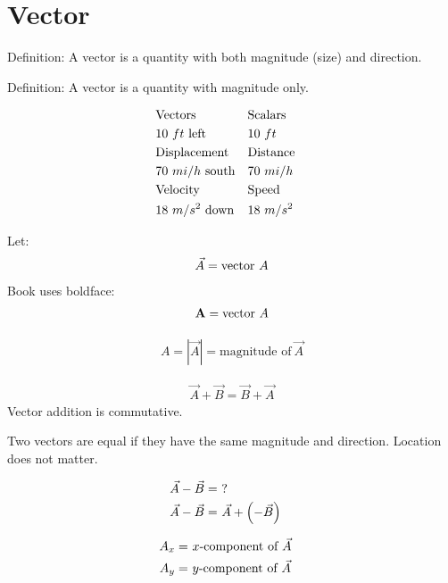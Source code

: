 \section{Vector}
	Definition: A vector is a quantity with both magnitude (size) and direction.

	Definition: A vector is a quantity with magnitude only.

	\begin{align}
		&\text{Vectors}& &\text{Scalars}& \notag \\
		&10 \ ft \ \text{left}& &10 \ ft& \notag \\
		&\text{Displacement}& &\text{Distance}& \notag \\
		&70 \ mi/h \ \text{south}& &70 \ mi/h& \notag \\
		&\text{Velocity}& &\text{Speed}& \notag \\
		&18 \ m/s^{2} \ \text{down}& &18 \ m/s^{2}& \notag \\
	\end{align}

	Let:
	\begin{align}
		\vec{A} = \text{vector} \ A \notag
	\end{align}
	Book uses boldface:
	\begin{align}
		\text{\textbf{A}} = \text{vector} \ A \notag
	\end{align}

	\begin{align}
		A = |\vec{A}| = \text{magnitude of} \ \vec{A}
	\end{align}


	\begin{align}
		\vec{A} + \vec{B} = \vec{B} + \vec{A}
	\end{align}
	Vector addition is commutative.

	Two vectors are equal if they have the same magnitude and direction. Location does not matter.

	\begin{align}
		\vec{A} - \vec{B} = \ &\text{?}& \notag \\
		\vec{A} - \vec{B} = \ &\vec{A} + \left( -\vec{B} \right)& \notag
	\end{align}


	\begin{align}
		A_{x} = \ &x\text{-component of} \ \vec{A}& \notag \\
		A_{y} = \ &y\text{-component of} \ \vec{A}& \notag
	\end{align}

